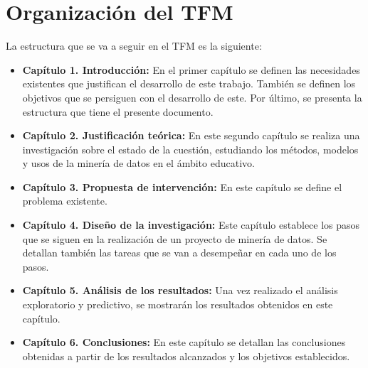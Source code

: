 \section{Organización del TFM}
La estructura que se va a seguir en el TFM es la siguiente:
\begin{itemize}
	\item \textbf{Capítulo 1. Introducción:} En el primer capítulo se definen las necesidades existentes que justifican el desarrollo de este trabajo. También se definen los objetivos que se persiguen con el desarrollo de este. Por último, se presenta la estructura que tiene el presente documento.
	\item \textbf{Capítulo 2. Justificación teórica:} En este segundo capítulo se realiza una investigación sobre el estado de la cuestión, estudiando los métodos, modelos y usos de la minería de datos en el ámbito educativo. 
	\item \textbf{Capítulo 3. Propuesta de intervención:} En este capítulo se define el problema existente.
	\item \textbf{Capítulo 4. Diseño de la investigación:} Este capítulo establece los pasos que se siguen en la realización de un proyecto de minería de datos. Se detallan también las tareas que se van a desempeñar en cada uno de los pasos.
	\item \textbf{Capítulo 5. Análisis de los resultados:} Una vez realizado el análisis exploratorio y predictivo, se mostrarán los resultados obtenidos en este capítulo.
	\item \textbf{Capítulo 6. Conclusiones:} En este capítulo se detallan las conclusiones obtenidas a partir de los resultados alcanzados y los objetivos establecidos.
\end{itemize}
